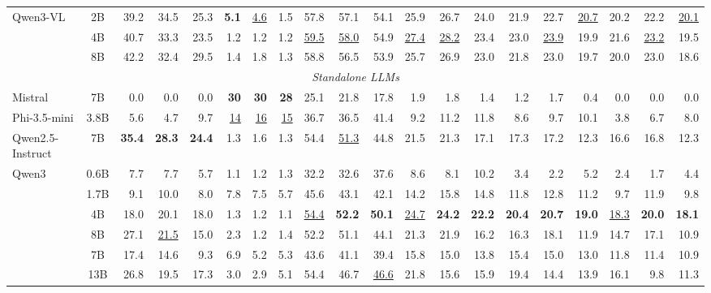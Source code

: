 \begin{table}[ht]
{\begin{tabular}{lcrrrrrrrrrrrrrrrrrr}
\multirow{3}{*}{Qwen3-VL}
 & 2B  & 39.2 & 34.5 & 25.3 & \textbf{5.1} & \underline{4.6} & 1.5 & 57.8 & 57.1 & 54.1 & 25.9 & 26.7 & 24.0 & 21.9 & 22.7 & \underline{20.7} & 20.2 & 22.2 & \underline{20.1} \\
 & 4B  & 40.7 & 33.3 & 23.5 & 1.2 & 1.2 & 1.2 & \underline{59.5} & \underline{58.0} & 54.9 & \underline{27.4} & \underline{28.2} & 23.4 & 23.0 & \underline{23.9} & 19.9 & 21.6 & \underline{23.2} & 19.5 \\
 & 8B  & 42.2 & 32.4 & 29.5 & 1.4 & 1.8 & 1.3 & 58.8 & 56.5 & 53.9 & 25.7 & 26.9 & 23.0 & 21.8 & 23.0 & 19.7 & 20.0 & 23.0 & 18.6 \\
\midrule
\multicolumn{20}{c}{\textit{Standalone LLMs}} \\
\midrule
Mistral & 7B & 0.0 & 0.0 & 0.0 & \textbf{30} & \textbf{30} & \textbf{28} & 25.1 & 21.8 & 17.8 & 1.9 & 1.8 & 1.4 & 1.2 & 1.7 & 0.4 & 0.0 & 0.0 & 0.0 \\
Phi-3.5-mini & 3.8B & 5.6 & 4.7 & 9.7 & \underline{14} & \underline{16} & \underline{15} & 36.7 & 36.5 & 41.4 & 9.2 & 11.2 & 11.8 & 8.6 & 9.7 & 10.1 & 3.8 & 6.7 & 8.0 \\
Qwen2.5-Instruct & 7B & \textbf{35.4} & \textbf{28.3} & \textbf{24.4} & 1.3 & 1.6 & 1.3 & 54.4 & \underline{51.3} & 44.8 & 21.5 & 21.3 & 17.1 & 17.3 & 17.2 & 12.3 & 16.6 & 16.8 & 12.3 \\
\multirow{5}{*}{Qwen3}
 & 0.6B & 7.7 & 7.7 & 5.7 & 1.1 & 1.2 & 1.3 & 32.2 & 32.6 & 37.6 & 8.6 & 8.1 & 10.2 & 3.4 & 2.2 & 5.2 & 2.4 & 1.7 & 4.4 \\
 & 1.7B & 9.1 & 10.0 & 8.0 & 7.8 & 7.5 & 5.7 & 45.6 & 43.1 & 42.1 & 14.2 & 15.8 & 14.8 & 11.8 & 12.8 & 11.2 & 9.7 & 11.9 & 9.8 \\
 & 4B  & 18.0 & 20.1 & 18.0 & 1.3 & 1.2 & 1.1 & \underline{54.4} & \textbf{52.2} & \textbf{50.1} & \underline{24.7} & \textbf{24.2} & \textbf{22.2} & \textbf{20.4} & \textbf{20.7} & \textbf{19.0} & \underline{18.3} & \textbf{20.0} & \textbf{18.1} \\
 & 8B  & 27.1 & \underline{21.5} & 15.0 & 2.3 & 1.2 & 1.4 & 52.2 & 51.1 & 44.1 & 21.3 & 21.9 & 16.2 & 16.3 & 18.1 & 11.9 & 14.7 & 17.1 & 10.9 \\
\multirow{2}{*}{Vicuna}
 & 7B  & 17.4 & 14.6 & 9.3 & 6.9 & 5.2 & 5.3 & 43.6 & 41.1 & 39.4 & 15.8 & 15.0 & 13.8 & 15.4 & 15.0 & 13.0 & 11.8 & 11.4 & 10.9 \\
 & 13B & 26.8 & 19.5 & 17.3 & 3.0 & 2.9 & 5.1 & 54.4 & 46.7 & \underline{46.6} & 21.8 & 15.6 & 15.9 & 19.4 & 14.4 & 13.9 & 16.1 & 9.8 & 11.3 \\
\bottomrule
\end{tabular}
}%
\end{table}
